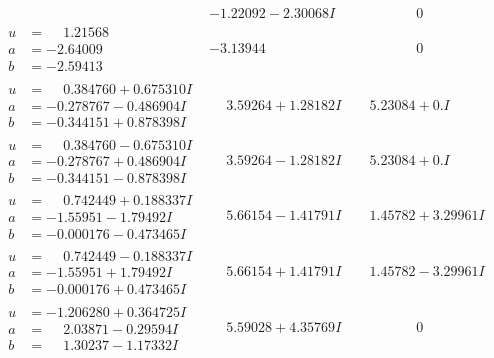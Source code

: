 \documentclass[1p]{elsarticle_modified}
\theoremstyle{definition}
\begin{document}
$$\begin{array}{c|c|c}
 & -1.22092 - 2.30068 I & \phantom{-0.000000 } 0 \\ \hline\begin{aligned}
u &= \phantom{-}1.21568\phantom{ +0.000000I} \\
a &= -2.64009\phantom{ +0.000000I} \\
b &= -2.59413\phantom{ +0.000000I}\end{aligned}
 & -3.13944\phantom{ +0.000000I} & \phantom{-0.000000 } 0 \\ \hline\begin{aligned}
u &= \phantom{-}0.384760 + 0.675310 I \\
a &= -0.278767 - 0.486904 I \\
b &= -0.344151 + 0.878398 I\end{aligned}
 & \phantom{-}3.59264 + 1.28182 I & \phantom{-}5.23084 + 0. I\phantom{ +0.000000I} \\ \hline\begin{aligned}
u &= \phantom{-}0.384760 - 0.675310 I \\
a &= -0.278767 + 0.486904 I \\
b &= -0.344151 - 0.878398 I\end{aligned}
 & \phantom{-}3.59264 - 1.28182 I & \phantom{-}5.23084 + 0. I\phantom{ +0.000000I} \\ \hline\begin{aligned}
u &= \phantom{-}0.742449 + 0.188337 I \\
a &= -1.55951 - 1.79492 I \\
b &= -0.000176 - 0.473465 I\end{aligned}
 & \phantom{-}5.66154 - 1.41791 I & \phantom{-}1.45782 + 3.29961 I \\ \hline\begin{aligned}
u &= \phantom{-}0.742449 - 0.188337 I \\
a &= -1.55951 + 1.79492 I \\
b &= -0.000176 + 0.473465 I\end{aligned}
 & \phantom{-}5.66154 + 1.41791 I & \phantom{-}1.45782 - 3.29961 I \\ \hline\begin{aligned}
u &= -1.206280 + 0.364725 I \\
a &= \phantom{-}2.03871 - 0.29594 I \\
b &= \phantom{-}1.30237 - 1.17332 I\end{aligned}
 & \phantom{-}5.59028 + 4.35769 I & \phantom{-0.000000 } 0 \\ \hline\begin{aligned}

\end{aligned}
\end{array}$$
\end{document}
